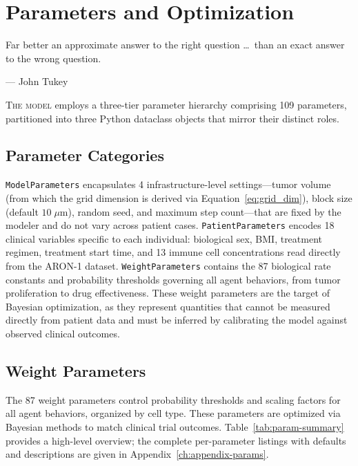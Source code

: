 \chapter{Parameters and Optimization}
\label{ch:parameters}

\epigraph{Far better an approximate answer to the right question \ldots\ than an exact answer to the wrong question.}{--- John Tukey}

\lettrine[lines=2]{T}{he model} employs a three-tier parameter hierarchy comprising 109 parameters, partitioned into three Python dataclass objects that mirror their distinct roles.

\section{Parameter Categories}
\label{sec:param-categories}

\texttt{ModelParameters} encapsulates 4 infrastructure-level settings---tumor volume (from which the grid dimension is derived via Equation~\ref{eq:grid_dim}), block size (default $10\;\mu\text{m}$), random seed, and maximum step count---that are fixed by the modeler and do not vary across patient cases. \texttt{PatientParameters} encodes 18 clinical variables specific to each individual: biological sex, BMI, treatment regimen, treatment start time, and 13 immune cell concentrations read directly from the ARON-1 dataset. \texttt{WeightParameters} contains the 87 biological rate constants and probability thresholds governing all agent behaviors, from tumor proliferation to drug effectiveness. These weight parameters are the target of Bayesian optimization, as they represent quantities that cannot be measured directly from patient data and must be inferred by calibrating the model against observed clinical outcomes.

\section{Weight Parameters}
\label{sec:weight-params}

The 87 weight parameters control probability thresholds and scaling factors for all agent behaviors, organized by cell type. These parameters are optimized via Bayesian methods to match clinical trial outcomes. Table~\ref{tab:param-summary} provides a high-level overview; the complete per-parameter listings with defaults and descriptions are given in Appendix~\ref{ch:appendix-params}.

